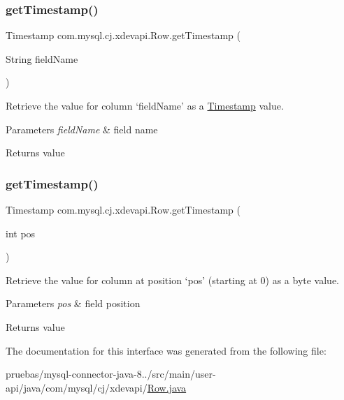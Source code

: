 \subsubsection{\texorpdfstring{get\+Timestamp()}{getTimestamp()}\hspace{0.1cm}{\footnotesize\ttfamily [1/2]}}
{\footnotesize\ttfamily Timestamp com.\+mysql.\+cj.\+xdevapi.\+Row.\+get\+Timestamp (\begin{DoxyParamCaption}\item[{String}]{field\+Name }\end{DoxyParamCaption})}

Retrieve the value for column `field\+Name' as a \mbox{\hyperlink{}{Timestamp}} value.


\begin{DoxyParams}{Parameters}
{\em field\+Name} & field name \\
\hline
\end{DoxyParams}
\begin{DoxyReturn}{Returns}
value 
\end{DoxyReturn}
\mbox{\label{interfacecom_1_1mysql_1_1cj_1_1xdevapi_1_1_row_a1787ae5b42c08a8a446d7ff7e6f8bd4e}} 
\subsubsection{\texorpdfstring{get\+Timestamp()}{getTimestamp()}\hspace{0.1cm}{\footnotesize\ttfamily [2/2]}}
{\footnotesize\ttfamily Timestamp com.\+mysql.\+cj.\+xdevapi.\+Row.\+get\+Timestamp (\begin{DoxyParamCaption}\item[{int}]{pos }\end{DoxyParamCaption})}

Retrieve the value for column at position `pos' (starting at 0) as a byte value.


\begin{DoxyParams}{Parameters}
{\em pos} & field position \\
\hline
\end{DoxyParams}
\begin{DoxyReturn}{Returns}
value 
\end{DoxyReturn}


The documentation for this interface was generated from the following file\+:\begin{DoxyCompactItemize}
\item 
pruebas/mysql-\/connector-\/java-\/8../src/main/user-\/api/java/com/mysql/cj/xdevapi/\mbox{\hyperlink{user-api_2java_2com_2mysql_2cj_2xdevapi_2_row_8java}{Row.\+java}}\end{DoxyCompactItemize}
